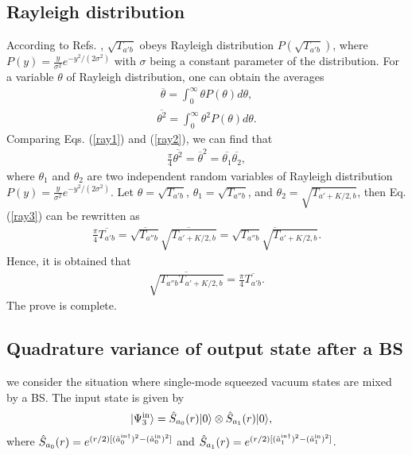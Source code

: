 \documentclass[9pt,twocolumn,twoside]{osajnl}
\begin{document}
\subsection{Rayleigh distribution}
\label{rayleigh}
According to Refs. \cite{goodman2015,starshynov2016}, $\sqrt{T_{a'b}}$ obeys Rayleigh distribution $P(\sqrt{T_{a'b}})$, where $P(y) = \frac{y}{\sigma^2} e^{-y^2/(2 \sigma^2)}$ with $\sigma$ being a constant parameter of the distribution. For a variable $\theta$ of Rayleigh distribution, one can obtain the averages 
\begin{align}
\label{ray1}
\overline{\theta} = \int_0^{\infty} \theta P(\theta) d \theta,
\end{align}
\begin{align}
\label{ray2}
\overline{\theta^2} = \int_0^{\infty} \theta^2 P(\theta) d \theta.
\end{align}
Comparing Eqs. (\ref{ray1}) and (\ref{ray2}), we can find that \begin{align}
\label{ray3}
 \frac{\pi}{4}\overline{\theta^2} = \overline{\theta}^2 = \overline{\theta_1}\overline{\theta_2},
\end{align}
where $\theta_1$ and $\theta_2$ are two independent random variables of Rayleigh distribution $P(y) = \frac{y}{\sigma^2} e^{-y^2/(2 \sigma^2)}$. Let $\theta = \sqrt{T_{a'b}}$, $\theta_1 = \sqrt{T_{a''b}}$, and $\theta_2 = \sqrt{T_{a'+K/2, b}}$, then Eq. (\ref{ray3}) can be rewritten as
\begin{align}
 \frac{\pi}{4}\overline{T_{a'b}}  =  \overline{\sqrt{T_{a''b}}}\overline{\sqrt{T_{a'+K/2, b}}} =  \overline{\sqrt{T_{a''b}}\sqrt{T_{a'+K/2, b}}}.
\end{align}
Hence, it is obtained that
\begin{align}
\overline{\sqrt{T_{a''b}T_{a'+K/2, b}}} = \frac{\pi}{4} \overline{T_{a'b}}.
\end{align}
The prove is complete.



\subsection{Quadrature variance of output state after a BS}

we consider the situation where single-mode squeezed vacuum states are mixed by a BS. The input state is given by
\begin{align}
\label{inputstate0}
|\Psi^{\rm{in}}_3\rangle &= \hat{S}_{a_0}(r) |0\rangle \otimes \hat{S}_{a_1}(r) |0\rangle,
\end{align}
where $\hat{S}_{a_0}(r) = e^{(r/2) [(\hat{a}_0^{\rm{in}\dagger})^{ 2}-  (\hat{a}_0^{\rm{in} })^2] }$ and $\hat{S}_{a_1}(r) = e^{(r/2) [(\hat{a}_1^{\rm{in}\dagger})^{ 2}-  (\hat{a}_1^{\rm{in} })^2] }$.
\end{document}
